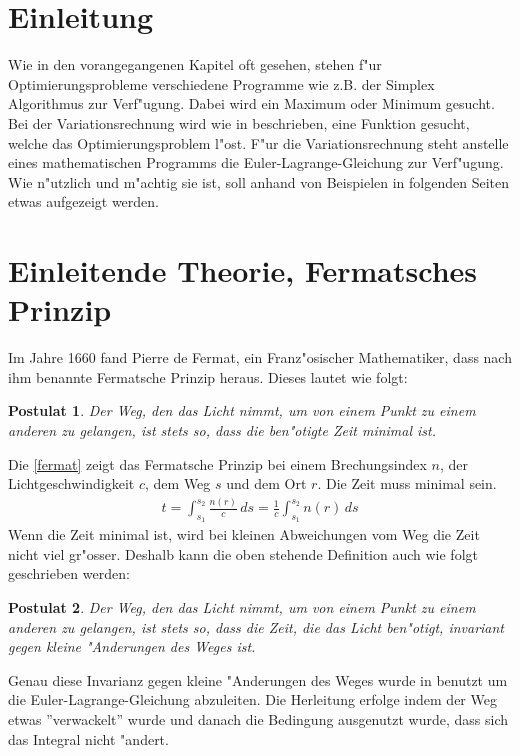 \newtheorem{postulat}{Postulat}

\section{Einleitung}
Wie in den vorangegangenen Kapitel oft gesehen, stehen f"ur
Optimierungsprobleme verschiedene Programme wie z.B. der Simplex
Algorithmus zur Verf"ugung. Dabei wird ein Maximum oder Minimum gesucht. Bei
der Variationsrechnung wird wie in 
beschrieben, eine Funktion gesucht, welche das Optimierungsproblem
l"ost. F"ur die Variationsrechnung steht anstelle eines mathematischen
Programms die Euler-Lagrange-Gleichung zur Verf"ugung. Wie n"utzlich und
m"achtig sie ist, soll anhand von Beispielen in folgenden Seiten etwas
aufgezeigt werden.
\section{Einleitende Theorie, Fermatsches Prinzip}
Im Jahre 1660 fand Pierre de Fermat, ein Franz"osischer Mathematiker,
dass  nach ihm benannte Fermatsche Prinzip heraus. 
Dieses lautet wie folgt:
\begin{postulat}
	Der Weg, den das Licht nimmt, 
	um von einem Punkt zu einem anderen zu gelangen, 
	ist stets so, dass die ben"otigte Zeit minimal ist.
	\cite{DefinitionFermat}
\end{postulat}
Die \eqref{fermat} zeigt das Fermatsche Prinzip bei einem Brechungsindex
$n$, 
der Lichtgeschwindigkeit $c$, dem Weg $s$ und dem Ort $r$. Die Zeit muss
minimal sein.
\begin{align}
	t= \int_{s_1}^{s_2} \frac{n(r)}{c}\, ds
= \frac{1}{c} \int_{s_1}^{s_2} n(r)\, ds
	\label{fermat}
\end{align}
Wenn die Zeit minimal ist, wird bei kleinen Abweichungen vom Weg die
Zeit nicht viel gr"osser. 
Deshalb kann die oben stehende Definition auch wie folgt geschrieben werden:
\begin{postulat}
Der Weg, den das Licht nimmt,  um von einem Punkt zu einem anderen zu
gelangen, 
ist stets so, dass die Zeit, die das Licht ben"otigt, invariant gegen
kleine "Anderungen des Weges ist.  \cite{DefinitionFermat}
\end{postulat}
Genau diese Invarianz gegen kleine "Anderungen des Weges
wurde in  benutzt um die
Euler-Lagrange-Gleichung abzuleiten. Die Herleitung erfolge indem der
Weg etwas ''verwackelt'' wurde und danach die Bedingung ausgenutzt wurde,
dass sich das Integral nicht "andert.

